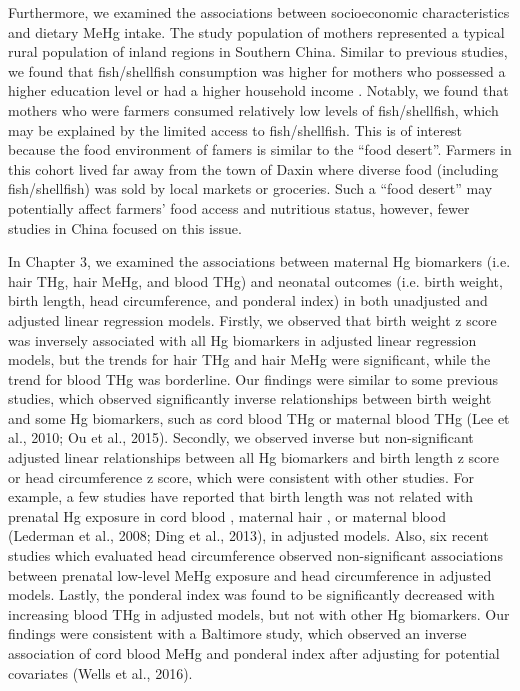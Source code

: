 Furthermore, we examined the associations between socioeconomic characteristics and dietary MeHg intake. The study population of mothers represented a typical rural population of inland regions in Southern China. Similar to previous studies, we found that fish/shellfish consumption was higher for mothers who possessed a higher education level or had a higher household income \citep{knobeloch2005fish,mahaffey2009adult,wang2009consumers,hightower2011mercury,zhou2015determinants}. Notably, we found that mothers who were farmers consumed relatively low levels of fish/shellfish, which may be explained by the limited access to fish/shellfish. This is of interest because the food environment of famers is similar to the ``food desert''. Farmers in this cohort lived far away from the town of Daxin where diverse food (including fish/shellfish) was sold by local markets or groceries. Such a ``food desert'' may potentially affect farmers' food access and nutritious status, however, fewer studies in China focused on this issue.

In Chapter 3, we examined the associations between maternal Hg biomarkers (i.e. hair THg, hair MeHg, and blood THg) and neonatal outcomes (i.e. birth weight, birth length, head circumference, and ponderal index) in both unadjusted and adjusted linear regression models. Firstly, we observed that birth weight z score was inversely associated with all Hg biomarkers in adjusted linear regression models, but the trends for hair THg
and hair MeHg were significant, while the trend for blood THg was borderline. Our findings were similar to some previous studies, which observed significantly inverse relationships between birth weight and some Hg biomarkers, such as cord blood THg \citep{ramon2010fish,lee2010interaction} or maternal blood THg (Lee et al., 2010; Ou et al., 2015). Secondly, we observed inverse but non-significant adjusted linear relationships between all Hg biomarkers and birth length z score or head circumference z score, which were consistent with other studies. For example, a few studies have reported that birth length was not related with prenatal Hg exposure in cord blood 
\citep{lederman2008relation,ding2013prenatal,guo2013levels,wells2016cord}, maternal hair \citep{drouillet2010prenatal,guo2013levels}, or maternal blood (Lederman et al., 2008; Ding et al., 2013), in adjusted models. Also, six recent studies which evaluated head circumference \citep{lederman2008relation,drouillet2010prenatal,gundacker2010perinatal,ding2013prenatal,guo2013levels,wells2016cord} observed non-significant associations between prenatal low-level MeHg exposure and head circumference in adjusted models. Lastly, the ponderal index was found to be significantly decreased with increasing blood THg in adjusted models, but not with other Hg biomarkers. Our findings were consistent with a Baltimore study, which observed an inverse association of cord blood MeHg and ponderal index after adjusting for potential covariates (Wells et al., 2016).

